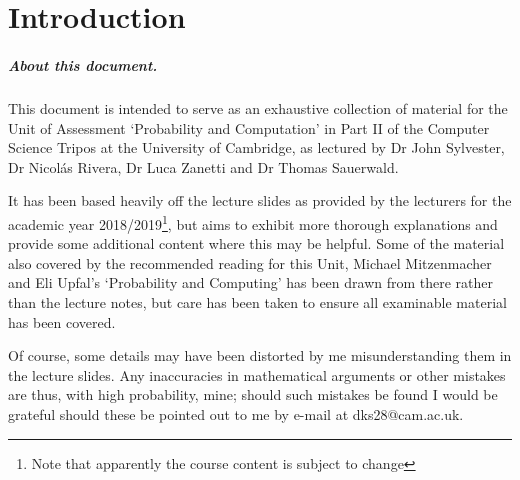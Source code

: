 \chapter*{Introduction}

	\paragraph{About this document.}
	This document is intended to serve as an exhaustive collection 
	of material for the Unit of Assessment ‘Probability and Computation’ in Part II of the
	Computer Science Tripos at the University of Cambridge, as lectured by Dr John Sylvester,
	Dr Nicolás Rivera, Dr Luca Zanetti and Dr Thomas Sauerwald.\par
	It  has  been  based  heavily off the lecture slides as provided by the lecturers for the academic year  
	2018/2019\footnote{Note that apparently the course content is subject to change},  but  
	aims  to  exhibit  more  thorough  explanations  and  provide
	some additional content where this may be helpful.  Some of the material also covered by
	the recommended reading for this Unit, Michael Mitzenmacher and Eli Upfal’s ‘Probability
	and Computing’ has been drawn from there rather than the lecture notes, but care has
	been taken to ensure all examinable material has been covered. \par
	Of course, some details may
	have been distorted by me misunderstanding them in the lecture slides.  Any inaccuracies in 
	mathematical arguments or other mistakes are thus, with high probability, mine; should such 
	mistakes be found I would be grateful should these be pointed out to me by e-mail at 
	dks28@cam.ac.uk. 
	
